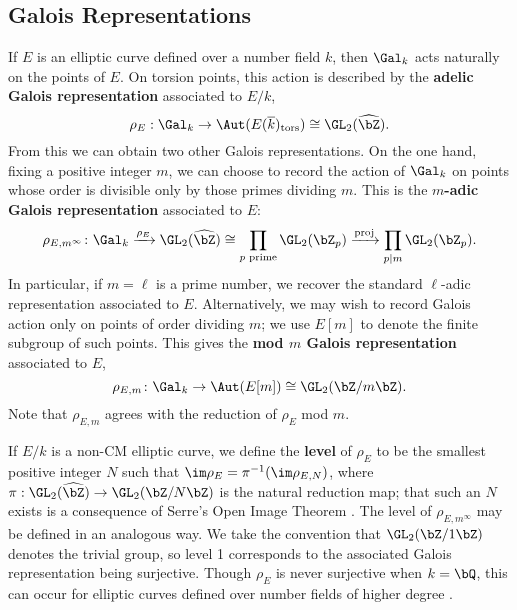 \documentclass[11pt,reqno]{amsart}
\theoremstyle{plain}
\theoremstyle{definition}
\newcommand{\Q}{\bQ}
\newcommand{\Z}{\bZ}
\newcommand{\proj}{\operatorname{proj}}
\newcommand{\abedit}[1]{{\color{blue} #1}}
\begin{document}
\subsection{Galois Representations} If $E$ is an elliptic curve defined over a number field $k$, then $\Gal_k$ acts naturally on the points of $E$. On torsion points, this action is described by the \textbf{adelic Galois representation} associated to $E/k$, 
\[
\rho_{E}: \Gal_k \rightarrow \Aut(E(\overline{k})_{\text{tors}}) \cong \GL_2(\widehat{\Z}). 
\]
From this we can obtain two other Galois representations. On the one hand, fixing a positive integer $m$, we can choose to record the action of $\Gal_k$ on points \abedit{whose order is divisible only by those primes dividing $m$}. This is the \textbf{$m$-adic Galois representation} associated to $E$: 
\[
\rho_{E,m^{\infty}}\colon \Gal_k \xrightarrow{\rho_E} \GL_2(\widehat{\Z}) \cong  \prod_{p \text{ prime}} \GL_2(\Z_{p}) \xrightarrow{\proj} \prod_{p \mid m} \GL_2(\Z_{p}).
\]
In particular, if $m=\ell$ is a prime number, we recover the standard $\ell$-adic representation associated to $E$. Alternatively, we may wish to record Galois action only on points of order dividing $m$; we use $E[m]$ to denote the finite subgroup of such points. This gives the \textbf{mod $m$ Galois representation} associated to $E$,
\[
\rho_{E,m}\colon \Gal_k \rightarrow \Aut(E[m]) \cong \GL_2(\Z/m\Z).
\]
Note that $\rho_{E,m}$ agrees with the reduction of $\rho_E$ mod $m$.

If $E/k$ is a non-CM elliptic curve, we define the \textbf{level} of $\rho_E$ to be the smallest positive integer $N$ such that $\im \rho_E=\pi^{-1}(\im \rho_{E,N})$, where $\pi:\GL_2(\widehat{\Z}) \rightarrow \GL_2(\Z/N\Z)$ is the natural reduction map; that such an $N$ exists is a consequence of Serre's Open Image Theorem \cite{serre72}. The level of $\rho_{E,m^{\infty}}$ may be defined in an analogous way. We take the convention that $\GL_2(\Z/1\Z)$ denotes the trivial group, so level 1 corresponds to the associated Galois representation being surjective. Though $\rho_E$ is never surjective when $k=\Q$, this can occur for elliptic curves defined over number fields of higher degree \cite[Theorem 1.2]{Greicius2010}.

\end{document}
